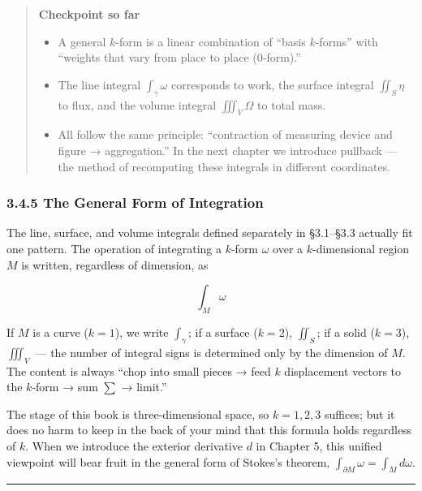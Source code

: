 \begin{quote}
\textbf{Checkpoint so far}

\begin{itemize}
\item
  A general \(k\)-form is a linear combination of ``basis \(k\)-forms''
  with ``weights that vary from place to place (\(0\)-form).''
\item
  The line integral \(\int_\gamma \omega\) corresponds to work, the
  surface integral \(\iint_S \eta\) to flux, and the volume integral
  \(\iiint_V \Omega\) to total mass.
\item
  All follow the same principle: ``contraction of measuring device and
  figure → aggregation.'' In the next chapter we introduce pullback ---
  the method of recomputing these integrals in different coordinates.
\end{itemize}
\end{quote}

\hypertarget{the-general-form-of-integration}{%
\subsubsection{3.4.5 The General Form of
Integration}\label{the-general-form-of-integration}}

The line, surface, and volume integrals defined separately in §3.1--§3.3
actually fit one pattern. The operation of integrating a \(k\)-form
\(\omega\) over a \(k\)-dimensional region \(M\) is written, regardless
of dimension, as

\[\int_M \omega\]

If \(M\) is a curve (\(k=1\)), we write \(\int_\gamma\); if a surface
(\(k=2\)), \(\iint_S\); if a solid (\(k=3\)), \(\iiint_V\) --- the
number of integral signs is determined only by the dimension of \(M\).
The content is always ``chop into small pieces → feed \(k\) displacement
vectors to the \(k\)-form → sum \(\sum\) → limit.''

The stage of this book is three-dimensional space, so \(k=1,2,3\)
suffices; but it does no harm to keep in the back of your mind that this
formula holds regardless of \(k\). When we introduce the exterior
derivative \(d\) in Chapter 5, this unified viewpoint will bear fruit in
the general form of Stokes's theorem,
\(\int_{\partial M} \omega = \int_M d\omega\).

\begin{center}\rule{0.5\linewidth}{0.5pt}\end{center}

